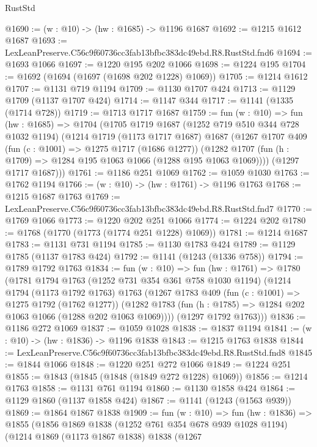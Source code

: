 \begin{lexlean}{RustStd}
\begin{coremodule}
@1690 := (w : @10) -> (hw : @1685) -> @1196 @1687
@1692 := @1215 @1612 @1687
@1693 := LexLeanPreserve.C56c9f60736cc3fab13bfbc383dc49ebd.R8.RustStd.fnd6
@1694 := @1693 @1066
@1697 := @1220 @195 @202 @1066
@1698 := @1224 @195
@1704 := @1692 (@1694 (@1697 (@1698 @202 @1228) @1069))
@1705 := @1214 @1612
@1707 := @1131 @719 @1194
@1709 := @1130 @1707 @424
@1713 := @1129 @1709 (@1137 @1707 @424)
@1714 := @1147 @344
@1717 := @1141 (@1335 (@1714 @728))
@1719 := @1713 @1717 @1687
@1759 := fun (w : @10) =>
  fun (hw : @1685) =>
  @1704
    (@1705
      @1719
      @1687
      (@1252 @719 @510 @344 @728 @1032 @1194)
      (@1214
        @1719
        (@1173 @1717 @1687)
        @1687
        (@1267
          @1707
          @409
          (fun (c : @1001) => @1275 @1717 (@1686 @1277))
          (@1282 @1707 (fun (h : @1709) => @1284 @195 @1063 @1066 (@1288 @195 @1063 @1069))))
        (@1297 @1717 @1687)))
@1761 := @1186 @251 @1069
@1762 := @1059 @1030
@1763 := @1762 @1194
@1766 := (w : @10) -> (hw : @1761) -> @1196 @1763
@1768 := @1215 @1687 @1763
@1769 := LexLeanPreserve.C56c9f60736cc3fab13bfbc383dc49ebd.R8.RustStd.fnd7
@1770 := @1769 @1066
@1773 := @1220 @202 @251 @1066
@1774 := @1224 @202
@1780 := @1768 (@1770 (@1773 (@1774 @251 @1228) @1069))
@1781 := @1214 @1687
@1783 := @1131 @731 @1194
@1785 := @1130 @1783 @424
@1789 := @1129 @1785 (@1137 @1783 @424)
@1792 := @1141 (@1243 (@1336 @758))
@1794 := @1789 @1792 @1763
@1834 := fun (w : @10) =>
  fun (hw : @1761) =>
  @1780
    (@1781
      @1794
      @1763
      (@1252 @731 @354 @361 @758 @1030 @1194)
      (@1214
        @1794
        (@1173 @1792 @1763)
        @1763
        (@1267
          @1783
          @409
          (fun (c : @1001) => @1275 @1792 (@1762 @1277))
          (@1282 @1783 (fun (h : @1785) => @1284 @202 @1063 @1066 (@1288 @202 @1063 @1069))))
        (@1297 @1792 @1763)))
@1836 := @1186 @272 @1069
@1837 := @1059 @1028
@1838 := @1837 @1194
@1841 := (w : @10) -> (hw : @1836) -> @1196 @1838
@1843 := @1215 @1763 @1838
@1844 := LexLeanPreserve.C56c9f60736cc3fab13bfbc383dc49ebd.R8.RustStd.fnd8
@1845 := @1844 @1066
@1848 := @1220 @251 @272 @1066
@1849 := @1224 @251
@1855 := @1843 (@1845 (@1848 (@1849 @272 @1228) @1069))
@1856 := @1214 @1763
@1858 := @1131 @761 @1194
@1860 := @1130 @1858 @424
@1864 := @1129 @1860 (@1137 @1858 @424)
@1867 := @1141 (@1243 (@1563 @939))
@1869 := @1864 @1867 @1838
@1909 := fun (w : @10) =>
  fun (hw : @1836) =>
  @1855
    (@1856
      @1869
      @1838
      (@1252 @761 @354 @678 @939 @1028 @1194)
      (@1214
        @1869
        (@1173 @1867 @1838)
        @1838
        (@1267

\end{coremodule}
\end{lexlean}
